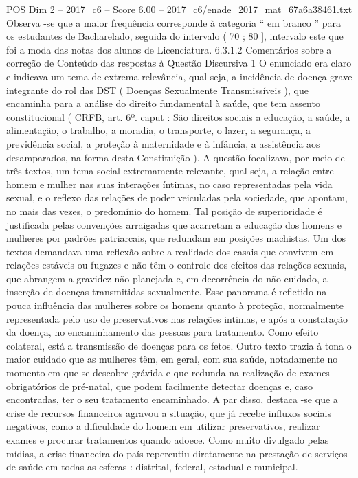 \begin{textsample}{POS Dim 2 – 2017\_c6 – Score 6.00 – 2017\_c6/enade\_2017\_mat\_67a6a38461.txt}
Observa -se que a maior frequência corresponde à categoria “ em branco ” para os estudantes de Bacharelado, seguida do intervalo ( 70 ; 80 ], intervalo este que foi a moda das notas dos alunos de Licenciatura. 6.3.1.2 Comentários sobre a correção de Conteúdo das respostas à Questão Discursiva 1 O enunciado era claro e indicava um tema de extrema relevância, qual seja, a incidência de doença grave integrante do rol das DST ( Doenças Sexualmente Transmissíveis ), que encaminha para a análise do direito fundamental à saúde, que tem assento constitucional ( CRFB, art. 6º. caput : São direitos sociais a educação, a saúde, a alimentação, o trabalho, a moradia, o transporte, o lazer, a segurança, a previdência social, a proteção à maternidade e à infância, a assistência aos desamparados, na forma desta Constituição ).
A questão focalizava, por meio de três textos, um tema social extremamente relevante, qual seja, a relação entre homem e mulher nas suas interações íntimas, no caso representadas pela vida sexual, e o reflexo das relações de poder veiculadas pela sociedade, que apontam, no mais das vezes, o predomínio do homem.
Tal posição de superioridade é justificada pelas convenções arraigadas que acarretam a educação dos homens e mulheres por padrões patriarcais, que redundam em posições machistas.
Um dos textos demandava uma reflexão sobre a realidade dos casais que convivem em relações estáveis ou fugazes e não têm o controle dos efeitos das relações sexuais, que abrangem a gravidez não planejada e, em decorrência do não cuidado, a inserção de doenças transmitidas sexualmente.
Esse panorama é refletido na pouca influência das mulheres sobre os homens quanto à proteção, normalmente representada pelo uso de preservativos nas relações intimas, e após a constatação da doença, no encaminhamento das pessoas para tratamento.
Como efeito colateral, está a transmissão de doenças para os fetos.
Outro texto trazia à tona o maior cuidado que as mulheres têm, em geral, com sua saúde, notadamente no momento em que se descobre grávida e que redunda na realização de exames obrigatórios de pré-natal, que podem facilmente detectar doenças e, caso encontradas, ter o seu tratamento encaminhado.
A par disso, destaca -se que a crise de recursos financeiros agravou a situação, que já recebe influxos sociais negativos, como a dificuldade do homem em utilizar preservativos, realizar exames e procurar tratamentos quando adoece.
Como muito divulgado pelas mídias, a crise financeira do país repercutiu diretamente na prestação de serviços de saúde em todas as esferas : distrital, federal, estadual e municipal.

\end{textsample}

